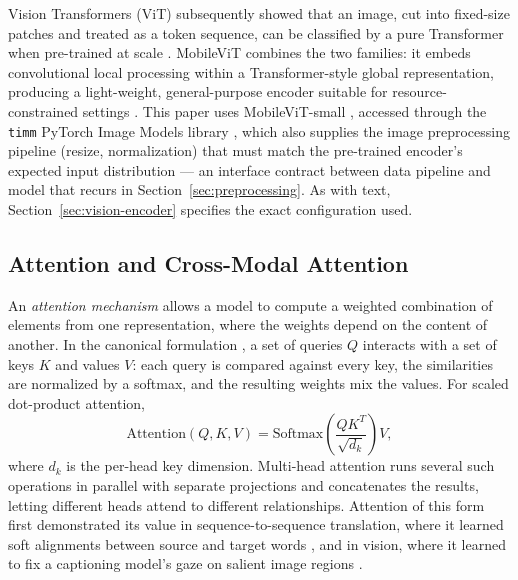 \documentclass[10pt,twoside]{article}
\newcommand{\code}[1]{\texttt{#1}}
\begin{document}
Vision Transformers (ViT) subsequently showed that an image, cut into fixed-size patches and treated as a token sequence, can be classified by a pure Transformer when pre-trained at scale \citep{dosovitskiy2021vit}. MobileViT combines the two families: it embeds convolutional local processing within a Transformer-style global representation, producing a light-weight, general-purpose encoder suitable for resource-constrained settings \citep{mehta2022mobilevit}. This paper uses MobileViT-small \citep{mehta2022mobilevit}, accessed through the \code{timm} PyTorch Image Models library \citep{wightman2019timm}, which also supplies the image preprocessing pipeline (resize, normalization) that must match the pre-trained encoder's expected input distribution --- an interface contract between data pipeline and model that recurs in Section~\ref{sec:preprocessing}. As with text, Section~\ref{sec:vision-encoder} specifies the exact configuration used.

\subsection{Attention and Cross-Modal Attention}\label{sec:bg-attention}

An \emph{attention mechanism} allows a model to compute a weighted combination of elements from one representation, where the weights depend on the content of another. In the canonical formulation \citep{vaswani2017attention}, a set of queries $Q$ interacts with a set of keys $K$ and values $V$: each query is compared against every key, the similarities are normalized by a softmax, and the resulting weights mix the values. For scaled dot-product attention,
\begin{equation}\label{eq:attention}
\text{Attention}(Q, K, V) = \text{Softmax}\!\left( \frac{QK^{T}}{\sqrt{d_k}} \right) V,
\end{equation}
where $d_k$ is the per-head key dimension. Multi-head attention runs several such operations in parallel with separate projections and concatenates the results, letting different heads attend to different relationships. Attention of this form first demonstrated its value in sequence-to-sequence translation, where it learned soft alignments between source and target words \citep{bahdanau2015align}, and in vision, where it learned to fix a captioning model's gaze on salient image regions \citep{xu2015show}.
\end{document}

